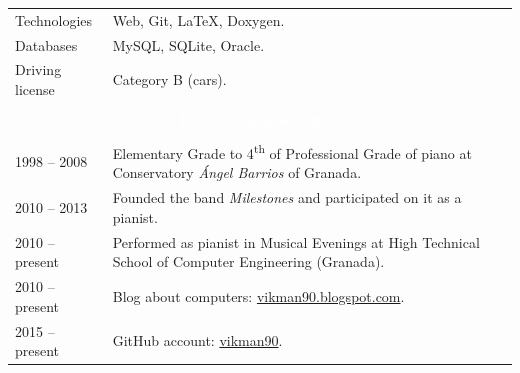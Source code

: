 \documentclass[12pt,a4paper]{article}
\newcommand{\header}[1]{\multicolumn{2}{c}{\cellcolor{black} \textcolor{white} {#1}} \\}
\begin{document}
\begin{longtable}{p{}p{}}
		Technologies & Web, Git, LaTeX, Doxygen. \\
		Databases & MySQL, SQLite, Oracle. \\
		Driving license & Category B (cars). \\
		\\
		\header{\textbf{Interests and activities}}
		\\
		1998 -- 2008 & Elementary Grade to 4\textsuperscript{th} of Professional
		Grade of piano at Conservatory \textit{Ángel Barrios} of Granada. \\
		2010 -- 2013 & Founded the band \textit{Milestones} and participated on
		it as a pianist. \\
		2010 -- present & Performed as pianist in Musical Evenings at High
		Technical School of Computer Engineering (Granada). \\
		2010 -- present & Blog about computers: 
		\href{http://vikman90.blogspot.com}{vikman90.blogspot.com}. \\
		2015 -- present & GitHub account: 
		\href{https://github.com/vikman90}{vikman90}. \\
	\end{longtable}
\end{document}

